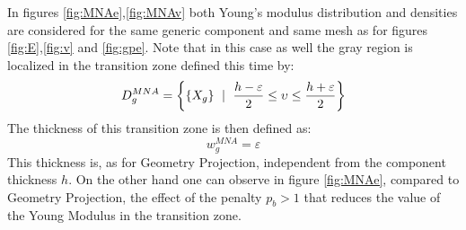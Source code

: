 In figures \ref{fig:MNAe},\ref{fig:MNAv} both Young's modulus distribution and densities are considered for the same generic component and same mesh as for figures \ref{fig:E},\ref{fig:v} and \ref{fig:gpe}. Note that in this case as well the gray region is localized in the transition zone defined this time by:
\begin{equation}
D_g^{MNA}=\left\lbrace \left\{{X_g}\right\}\ \mid \  \frac{h-\varepsilon}{2}\leq \upsilon \leq  \frac{h+\varepsilon}{2}\right\rbrace    
\end{equation}
The thickness of this transition zone is then defined as:
\begin{equation}
    w_g^{MNA}=\varepsilon
\end{equation}
This thickness is, as for Geometry Projection, independent from the component thickness $h$. On the other hand one can observe in figure \ref{fig:MNAe}, compared to Geometry Projection, the effect of the penalty $p_b>1$ that reduces the value of the Young Modulus in the transition zone. 
